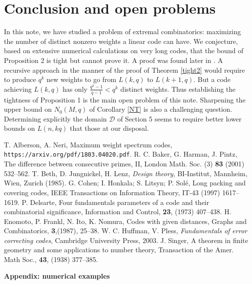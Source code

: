 \documentclass[12pt]{article}
\theoremstyle{definition}
\begin{document}
\section{Conclusion and open problems}
In this note, we have studied a  problem of extremal combinatorics: maximizing the number of distinct nonzero weights a linear code can have.
We conjecture, based on extensive numerical calculations on very long codes, that the bound of Proposition 2 is tight but cannot prove it. A proof was found later in \cite{proof}.
A recursive approach in the manner of the proof of Theorem \ref{tight2} would require to produce $q^k$ new weights to go from $L(k,q)$ to $L(k+1,q).$
But a code achieving $L(k,q)$ has only $\frac{q^k-1}{q-1}<q^k$ distinct weights. Thus establishing the tightness of Proposition 1 is the main open problem of this note.
Sharpening the upper bound on $N_0(M,q)$ of Corollary \ref{NT} is also a challenging question.
Determining explicitly the domain $\mathcal D$ of Section 5 seems to require better lower bounds on $L(n,kq)$ that those at our disposal.
\begin{thebibliography}{99}
T. Alberson, A. Neri, Maximum weight spectrum codes, {\tt https://arxiv.org/pdf/1803.04020.pdf}.
 R.  C.  Baker,  G.  Harman, J.  Pintz, The difference between consecutive primes, II,  London  Math.  Soc.
(3)  {\bf 83}  (2001)  532--562.
T. Beth, D. Jungnickel, H. Lenz, {\it Design theory}, BI-Institut, Mannheim, Wien, Zurich (1985).
 G. Cohen; I. Honkala; S. Litsyn; P. Sol\'e, Long packing and covering codes, IEEE Transactions on Information Theory, IT-43 (1997) 1617-- 1619.
 P. Delsarte, Four fundamentals parameters of a code and their combinatorial significance, Information and Control, {\bf 23}, (1973) 407--438.
H. Enomoto, P. Frankl, N. Ito, K. Nomura, Codes with given distances, Graphs and Combinatorics, {\bf 3},(1987), 25--38.
 W. C. Huffman, V. Pless, {\it Fundamentals of error correcting codes}, Cambridge University Press, 2003.
J. Singer, A theorem in finite geometry and some applications to number theory, Transaction of the Amer. Math Soc., {\bf 43}, (1938) 377--385.
\end{thebibliography}
{\bf Appendix: numerical examples}
\end{document}
